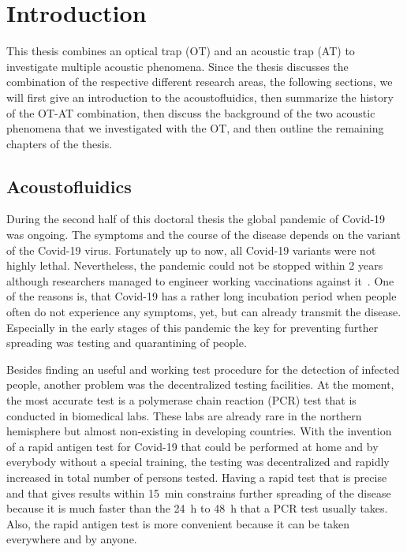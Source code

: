 \chapter{Introduction\label{ch:intro}}

This thesis combines an optical trap (OT) and an acoustic trap (AT) to 
investigate multiple acoustic phenomena. Since the thesis discusses the 
combination of the respective different research areas, the following sections, 
we will first give an introduction to the acoustofluidics, then summarize the 
history of the OT-AT combination, then discuss the background of the two 
acoustic phenomena that we investigated with the OT, and then outline the 
remaining chapters of the thesis.

\section{Acoustofluidics}

During the second half of this doctoral thesis the global pandemic of Covid-19 
was ongoing. The symptoms and the course of the disease depends on the variant 
of the Covid-19 virus. Fortunately up to now, all Covid-19 variants were not 
highly lethal. Nevertheless, the pandemic could not be stopped within 2 years 
although researchers managed to engineer working vaccinations against 
it~\cite{Polack2020,Mahase2020,Voysey2021}. One of the reasons is, that 
Covid-19 has a rather long incubation period when people often do not 
experience any symptoms, yet, but can already transmit the disease. Especially 
in the early stages of this pandemic the key for preventing further spreading 
was testing and quarantining of people.

Besides finding an useful and working test procedure for the detection of 
infected people, another problem was the decentralized testing facilities. At 
the moment, the most accurate test is a polymerase chain reaction (PCR) test 
that is conducted in biomedical labs. These labs are already rare in the 
northern hemisphere but almost non-existing in developing countries. With the 
invention of a rapid antigen test for Covid-19 that could be performed at home 
and by everybody without a special training, the testing was decentralized and 
rapidly increased in total number of persons tested. Having a rapid test that 
is precise~\cite{Albert2021} and that gives results within \SI{15}{\minute} 
constrains further spreading of the disease because it is much faster than the 
\SI{24}{\hour} to \SI{48}{\hour} that a PCR test usually takes. Also, the 
rapid antigen test is more convenient because it can be taken everywhere and by 
anyone.

